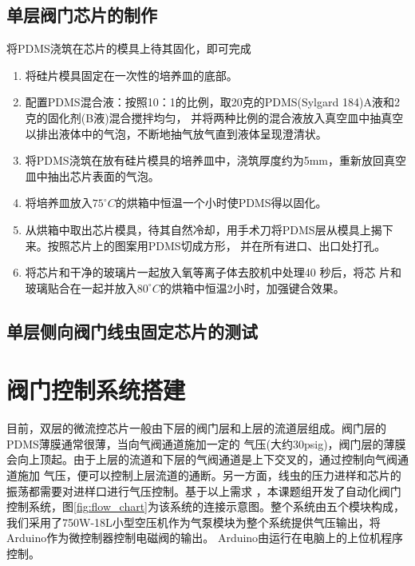 \subsection{单层阀门芯片的制作}
	将PDMS浇筑在芯片的模具上待其固化，即可完成
	\begin{enumerate}[label={\alph*)},font={\color{black!50!black}\bfseries}]
	\item 将硅片模具固定在一次性的培养皿的底部。
	\item 配置PDMS混合液：按照10：1的比例，取20克的PDMS(Sylgard 184)A液和2克的固化剂(B液)混合搅拌均匀，
	并将两种比例的混合液放入真空皿中抽真空以排出液体中的气泡，不断地抽气放气直到液体呈现澄清状。
	\item 将PDMS浇筑在放有硅片模具的培养皿中，浇筑厚度约为5mm，重新放回真空皿中抽出芯片表面的气泡。
	\item 将培养皿放入$75^\circ C$的烘箱中恒温一个小时使PDMS得以固化。
	\item 从烘箱中取出芯片模具，待其自然冷却，用手术刀将PDMS层从模具上揭下来。按照芯片上的图案用PDMS切成方形，
	并在所有进口、出口处打孔。
	\item 将芯片和干净的玻璃片一起放入氧等离子体去胶机中处理40 秒后，将芯
片和玻璃贴合在一起并放入$80^\circ C$的烘箱中恒温2小时，加强键合效果。
	\end{enumerate}
\subsection{单层侧向阀门线虫固定芯片的测试}

\section{阀门控制系统搭建}
	目前，双层的微流控芯片一般由下层的阀门层和上层的流道层组成。阀门层的PDMS薄膜通常很薄，当向气阀通道施加一定的
	气压(大约30psig)，阀门层的薄膜会向上顶起。由于上层的流道和下层的气阀通道是上下交叉的，通过控制向气阀通道施加
	气压，便可以控制上层流道的通断。另一方面，线虫的压力进样和芯片的振荡都需要对进样口进行气压控制。基于以上需求
	，本课题组开发了自动化阀门控制系统，图\ref{fig:flow_chart}为该系统的连接示意图。整个系统由五个模块构成，
	我们采用了750W-18L小型空压机作为气泵模块为整个系统提供气压输出，将Arduino作为微控制器控制电磁阀的输出。
	Arduino由运行在电脑上的上位机程序控制。

